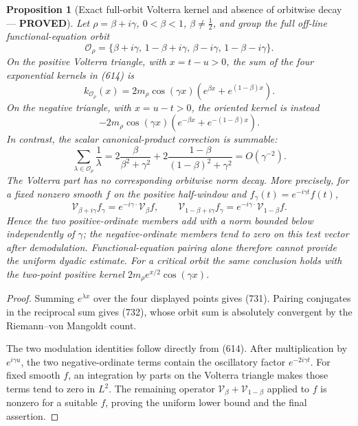 \documentclass[11pt]{article}
\newtheorem{proposition}[theorem]{Proposition}
\newcommand{\PROVED}{\textcolor{green!45!black}{\textbf{PROVED}}}
\begin{document}
\begin{proposition}[Exact full-orbit Volterra kernel and absence of
orbitwise decay --- \PROVED]
Let \(\rho=\beta+i\gamma\), \(0<\beta<1\), \(\beta\ne\frac12\), and group
the full off-line functional-equation orbit
\[
 \mathcal O_\rho=\{\beta+i\gamma,\,1-\beta+i\gamma,\,
                   \beta-i\gamma,\,1-\beta-i\gamma\}.
\]
On the positive Volterra triangle, with \(x=t-u>0\), the sum of the
four exponential kernels in (614) is
\begin{equation}
 \boxed{
 k_{\mathcal O_\rho}(x)
 =2m_\rho\cos(\gamma x)
   \left(e^{\beta x}+e^{(1-\beta)x}\right).}         \tag{731}
\end{equation}
On the negative triangle, with \(x=u-t>0\), the oriented kernel is instead
\[
 -2m_\rho\cos(\gamma x)
   \left(e^{-\beta x}+e^{-(1-\beta)x}\right).
\]
In contrast, the scalar canonical-product correction is summable:
\begin{equation}
 \sum_{\lambda\in\mathcal O_\rho}\frac1\lambda
 =2\frac{\beta}{\beta^2+\gamma^2}
  +2\frac{1-\beta}{(1-\beta)^2+\gamma^2}
 =O(\gamma^{-2}).                                   \tag{732}
\end{equation}
The Volterra part has no corresponding orbitwise norm decay.  More
precisely, for a fixed nonzero smooth \(f\) on the positive half-window and
\(f_\gamma(t)=e^{-i\gamma t}f(t)\),
\[
 \mathcal V_{\beta+i\gamma}f_\gamma
 =e^{-i\gamma\cdot}\mathcal V_\beta f,\qquad
 \mathcal V_{1-\beta+i\gamma}f_\gamma
 =e^{-i\gamma\cdot}\mathcal V_{1-\beta}f.
\]
Hence the two positive-ordinate members add with a norm bounded below
independently of \(\gamma\); the negative-ordinate members tend to zero on
this test vector after demodulation.  Functional-equation pairing alone
therefore cannot provide the uniform dyadic estimate.
For a critical orbit the same conclusion holds with the two-point positive
kernel \(2m_\rho e^{x/2}\cos(\gamma x)\).
\end{proposition}

\begin{proof}
Summing \(e^{\lambda x}\) over the four displayed points gives (731).
Pairing conjugates in the reciprocal sum gives (732), whose orbit sum is
absolutely convergent by the Riemann--von Mangoldt count.

The two modulation identities follow directly from (614).  After
multiplication by \(e^{i\gamma u}\), the two negative-ordinate terms contain
the oscillatory factor \(e^{-2i\gamma t}\).  For fixed smooth \(f\), an
integration by parts on the Volterra triangle makes those terms tend to
zero in \(L^2\).  The remaining operator
\(\mathcal V_\beta+\mathcal V_{1-\beta}\) applied to \(f\) is nonzero for a
suitable \(f\), proving the uniform lower bound and the final assertion.
\end{proof}
\end{document}
